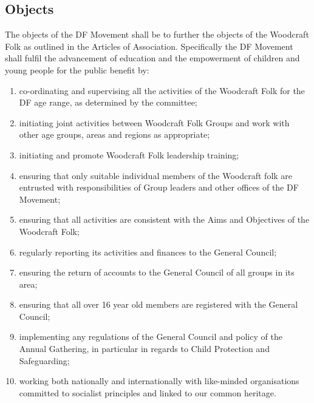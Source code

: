 \documentclass[a4paper, 11pt]{report}
\begin{document}
\subsection{Objects}
\label{sec:objects}
The objects of the DF Movement shall be to further the objects of the Woodcraft Folk as outlined in the Articles of Association. Specifically the DF Movement shall fulfil the advancement of education and the empowerment of children and young people for the public benefit by:
\begin{enumerate}
\item co-ordinating and supervising all the activities of the Woodcraft Folk for the DF age range, as determined by the committee;
\item initiating joint activities between Woodcraft Folk Groups and work with other age groups, areas and regions as appropriate;
\item initiating and promote Woodcraft Folk leadership training;
\item ensuring that only suitable individual members of the Woodcraft folk are entrusted with responsibilities of Group leaders and other offices of the DF Movement;
\item ensuring that all activities are consistent with the Aims and Objectives of the Woodcraft Folk;
\item regularly reporting its activities and finances to the General Council;
\item ensuring the return of accounts to the General Council of all groups in its area;
\item ensuring that all over 16 year old members are registered with the General Council;
\item implementing any regulations of the General Council and policy of the Annual Gathering, in particular in regards to Child Protection and Safeguarding;
\item working both nationally and internationally with like-minded organisations committed
to socialist principles and linked to our common heritage.
\end{enumerate}
\end{document}
